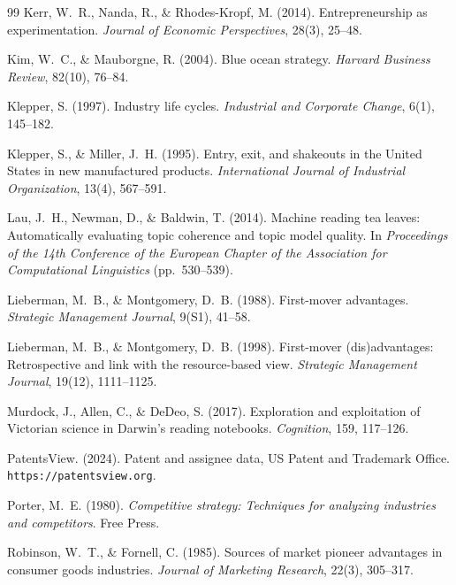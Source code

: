 \begin{thebibliography}{99}
Kerr, W.~R., Nanda, R., \& Rhodes-Kropf, M. (2014). Entrepreneurship as
experimentation. \emph{Journal of Economic Perspectives}, 28(3), 25--48.

Kim, W.~C., \& Mauborgne, R. (2004). Blue ocean strategy. \emph{Harvard
Business Review}, 82(10), 76--84.

Klepper, S. (1997). Industry life cycles. \emph{Industrial and Corporate
Change}, 6(1), 145--182.

Klepper, S., \& Miller, J.~H. (1995). Entry, exit, and shakeouts in the
United States in new manufactured products. \emph{International Journal
of Industrial Organization}, 13(4), 567--591.

Lau, J.~H., Newman, D., \& Baldwin, T. (2014). Machine reading tea leaves:
Automatically evaluating topic coherence and topic model quality. In
\emph{Proceedings of the 14th Conference of the European Chapter of the
Association for Computational Linguistics} (pp.~530--539).

Lieberman, M.~B., \& Montgomery, D.~B. (1988). First-mover advantages.
\emph{Strategic Management Journal}, 9(S1), 41--58.

Lieberman, M.~B., \& Montgomery, D.~B. (1998). First-mover (dis)advantages:
Retrospective and link with the resource-based view. \emph{Strategic
Management Journal}, 19(12), 1111--1125.

Murdock, J., Allen, C., \& DeDeo, S. (2017). Exploration and exploitation
of Victorian science in Darwin's reading notebooks. \emph{Cognition},
159, 117--126.

PatentsView. (2024). Patent and assignee data, US Patent and Trademark
Office. \texttt{https://patentsview.org}.

Porter, M.~E. (1980). \emph{Competitive strategy: Techniques for analyzing industries and
competitors}. Free Press.

Robinson, W.~T., \& Fornell, C. (1985). Sources of market pioneer advantages
in consumer goods industries. \emph{Journal of Marketing Research}, 22(3),
305--317.


\end{thebibliography}
